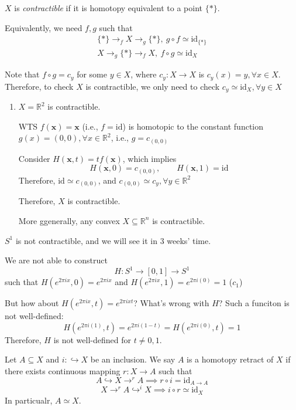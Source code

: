 \begin{definition}[Contractible]
$X$ is \emph{contractible} if it is homotopy equivalent to a point $\{*\}$.

Equivalently, we need $f,g$ such that
\begin{align*}
\{*\}\to_fX\to_g\{*\},\ g\circ f\simeq\text{id}_{\{*\}}\\
X\to_g\{*\}\to_fX,\ f\circ g\simeq\text{id}_{X}
\end{align*}
\end{definition}
Note that $f\circ g=c_y$ for some $y\in X$, where $c_y:X\to X$ is $c_y(x)=y,\forall x\in X$.
Therefore, to check $X$ is contractible, we only need to check $c_y\simeq\text{id}_{X},\forall y\in X$

\begin{example}
\begin{enumerate}
\item
$X=\mathbb{R}^2$ is contractible.

WTS $f(\bm x)=\bm x$ (i.e., $f=\text{id}$) is homotopic to the constant function $g(x)=(0,0),\forall x\in\mathbb{R}^2$, i.e., $g=c_{(0,0)}$

Consider $H(\bm x,t) = tf(\bm x)$, which implies
\[
H(\bm x,0)=c_{(0,0)},\qquad
H(\bm x,1)=\text{id}
\]
Therefore, $\text{id}\simeq c_{(0,0)}$, and $c_{(0,0)}\simeq c_y,\forall y\in\mathbb{R}^2$

Therefore, $X$ is contractible.

More ggenerally, any convex $X\subseteq\mathbb{R}^n$ is contractible.
\end{enumerate}
\end{example}

\begin{remark}
$S^1$ is not contractible, and we will see it in 3 weeks' time.

We are not able to construct 
\[
H:S^1\to[0,1]\to S^1
\]
such that $H(e^{2\pi ix},0)=e^{2\pi i x}$ and $H(e^{2\pi i x},1)=e^{2\pi i(0)} = 1$ ($c_1$)

But how about $H(e^{2\pi ix},t)=e^{2\pi ixt}$?
What's wrong with $H$?
Such a funciton is not well-defined:
\[
H(e^{2\pi i(1)},t)=e^{2\pi i(1-t)}=H(e^{2\pi i(0)},t)=1
\]
Therefore, $H$ is not well-defined for $t\ne0,1$.
\end{remark}


\begin{definition}
Let $A\subseteq X$ and $i:\hookrightarrow X$ be an inclusion.
We say $A$ is a homotopy retract of $X$ if there exists continuous mapping $r:X\to A$ such that 
\[
A\hookrightarrow X\to^r A\implies 
r\circ i=\text{id}_{A\to A}
\]
\[
X\to^rA\hookrightarrow^iX\implies i\circ r\simeq\text{id}_X
\]
In particualr, $A\simeq X$.
\end{definition}

